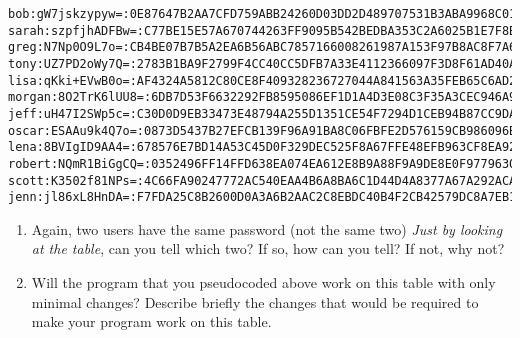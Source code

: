 \documentclass{article}
\begin{document}
\begin{verbatim}
bob:gW7jskzypyw=:0E87647B2AA7CFD759ABB24260D03DD2D489707531B3ABA9968C011EABC5945A
sarah:szpfjhADFBw=:C77BE15E57A670744263FF9095B542BEDBA353C2A6025B1E7F8B265F7369B315
greg:N7Np0O9L7o=:CB4BE07B7B5A2EA6B56ABC7857166008261987A153F97B8AC8F7A606B8A42A25
tony:UZ7PD2oWy7Q=:2783B1BA9F2799F4CC40CC5DFB7A33E4112366097F3D8F61AD40ACCD65721E13
lisa:qKki+EVwB0o=:AF4324A5812C80CE8F409328236727044A841563A35FEB65C6AD24A3A7D0766F
morgan:8O2TrK6lUU8=:6DB7D53F6632292FB8595086EF1D1A4D3E08C3F35A3CEC946A9B0A4FE51479BA
jeff:uH47I2SWp5c=:C30D0D9EB33473E48794A255D1351CE54F7294D1CEB94B87CC9DA52A1DE12925
oscar:ESAAu9k4Q7o=:0873D5437B27EFCB139F96A91BA8C06FBFE2D576159CB986096BC9405C87F359
lena:8BVIgID9AA4=:678576E7BD14A53C45D0F329DEC525F8A67FFE48EFB963CF8EA921586D4A6FF8
robert:NQmR1BiGgCQ=:0352496FF14FFD638EA074EA612E8B9A88F9A9DE8E0F977963068836563A0ADC
scott:K3502f81NPs=:4C66FA90247772AC540EAA4B6A8BA6C1D44D4A8377A67A292ACA11C66E85F1DB
jenn:jl86xL8HnDA=:F7FDA25C8B2600D0A3A6B2AAC2C8EBDC40B4F2CB42579DC8A7EB1A09CA87EC2F
\end{verbatim}

\begin{enumerate}
	\item Again, two users have the same password (not the same two) \emph{Just by looking at the table}, can you tell which two? If so, how can you tell?  If not, why not?
	\item Will the program that you pseudocoded above work on this table with only minimal changes? Describe briefly the changes that would be required to make your program work on this table.
	
\end{enumerate}
\end{document}
